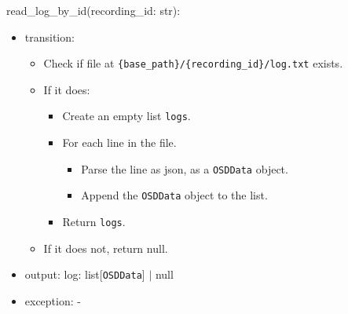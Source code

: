\documentclass[12pt, titlepage]{article}
\begin{document}
\noindent read\_log\_by\_id(recording\_id: str):
\begin{itemize}
  \item transition:
        \begin{itemize}
          \item Check if file at \texttt{\{base\_path\}/\{recording\_id\}/log.txt} exists.
          \item If it does:
                \begin{itemize}
                  \item Create an empty list \texttt{logs}.
                  \item For each line in the file.
                        \begin{itemize}
                          \item Parse the line as json, as a \texttt{OSDData} object.
                          \item Append the \texttt{OSDData} object to the list.
                        \end{itemize}
                  \item Return \texttt{logs}.
                \end{itemize}
          \item If it does not, return null.
        \end{itemize}
  \item output: log: list[\texttt{OSDData}] $|$ null
  \item exception: -
\end{itemize}
\end{document}
